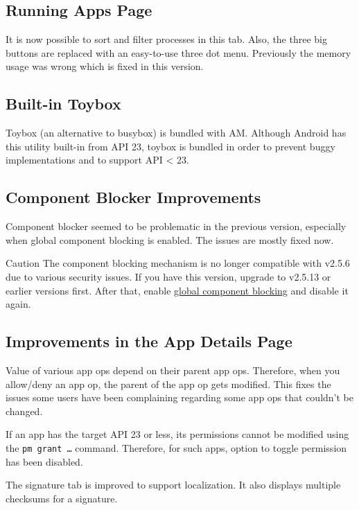 \subsection{Running Apps Page}
It is now possible to sort and filter processes in this tab. Also, the three big buttons are replaced with an
easy-to-use three dot menu. Previously the memory usage was wrong which is fixed in this version.

\subsection{Built-in Toybox}
Toybox (an alternative to busybox) is bundled with AM. Although Android has this utility built-in from API 23, toybox
is bundled in order to prevent buggy implementations and to support API < 23.

\subsection{Component Blocker Improvements}
Component blocker seemed to be problematic in the previous version, especially when global component blocking is enabled.
The issues are mostly fixed now.

\begin{warning}{Caution}
    The component blocking mechanism is no longer compatible with v2.5.6 due to various security issues. If you have
    this version, upgrade to v2.5.13 or earlier versions first. After that, enable
    \hyperref[subsubsec:instant-component-blocking]{global component blocking} and disable it again.
\end{warning}

\subsection{Improvements in the App Details Page}
Value of various app ops depend on their parent app ops. Therefore, when you allow/deny an app op, the parent of the app
op gets modified. This fixes the issues some users have been complaining regarding some app ops that couldn't be changed.

If an app has the target API 23 or less, its permissions cannot be modified using the \texttt{pm grant \ldots} command.
Therefore, for such apps, option to toggle permission has been disabled.

The signature tab is improved to support localization. It also displays multiple checksums for a signature.

